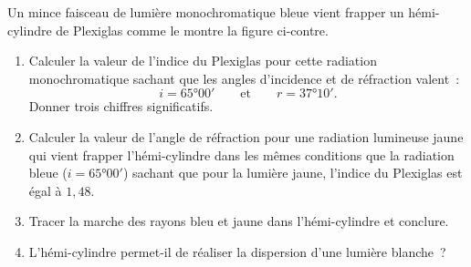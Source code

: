 \begin{minipage}{0.72\linewidth}
    Un mince faisceau de lumière monochromatique bleue vient frapper un
    hémi-cylindre de Plexiglas comme le montre la figure ci-contre.
    \begin{enumerate}
        \item Calculer la valeur de l'indice du Plexiglas pour cette radiation
              monochromatique sachant que les angles d'incidence et de
              réfraction valent~:
              \[
                  i=\ang{65;00}
                  \qquad\text{et}\qquad
                  r=\ang{37;10}.
              \]
              Donner trois chiffres significatifs.
    \end{enumerate}
\end{minipage}
\hfill
\begin{minipage}{0.24\linewidth}
    \flushright
\end{minipage}

\begin{enumerate}
    \setcounter{enumi}{1}
    \item Calculer la valeur de l'angle de réfraction pour une radiation
          lumineuse jaune qui vient frapper l'hémi-cylindre dans les mêmes
          conditions que la radiation bleue ($i=\ang{65;00}$) sachant que pour
          la lumière jaune, l'indice du Plexiglas est égal à $1,48$.
    \item Tracer la marche des rayons bleu et jaune dans l'hémi-cylindre et
          conclure.
    \item L'hémi-cylindre permet-il de réaliser la dispersion d'une lumière
          blanche~?
\end{enumerate}
